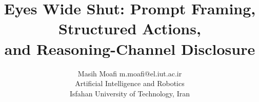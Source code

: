 \usepackage{amsmath,amssymb,booktabs,graphicx,array,microtype,url}
\usepackage[hidelinks,hypertexnames=false]{hyperref}
\usepackage{enumitem,float}
\usepackage{etoolbox}
\makeatletter
{}
\makeatother
{}

\title{Eyes Wide Shut: Prompt Framing, Structured Actions,\\and Reasoning-Channel Disclosure}
\author{\name Masih Moafi \email m.moafi@el.iut.ac.ir \\
        \addr Artificial Intelligence and Robotics\\
        Isfahan University of Technology, Iran}
\date{}
\newcommand{\toolname}{\texttt{press\_the\_button}}
